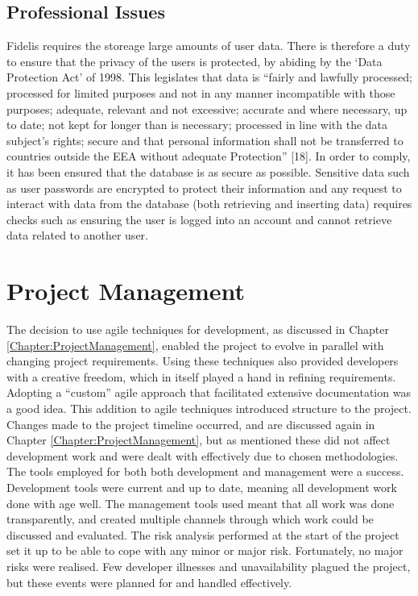 \subsection{Professional Issues}
Fidelis requires the storeage large amounts of user data. There is therefore a duty to ensure that the privacy of the users is protected, by abiding by the `Data Protection Act' of 1998. This legislates that data is ``fairly and lawfully processed; processed for limited purposes and not in any manner incompatible with those purposes; adequate, relevant and not excessive; accurate and where necessary, up to date; not kept for longer than is necessary; processed in line with the data subject's rights; secure and that personal information shall not be transferred to countries outside the EEA without adequate Protection'' [18]. In order to comply, it has been ensured that the database is as secure as possible. Sensitive data such as user passwords are encrypted to protect their information and any request to interact with data from the database (both retrieving and inserting data) requires checks such as ensuring the user is logged into an account and cannot retrieve data related to another user.

\section{Project Management}
The decision to use agile techniques for development, as discussed in Chapter \ref{Chapter:ProjectManagement}, enabled the project to evolve in parallel with changing project requirements. Using these techniques also provided developers with a creative freedom, which in itself played a hand in refining requirements. Adopting a ``custom'' agile approach that facilitated extensive documentation was a good idea. This addition to agile techniques introduced structure to the project. Changes made to the project timeline occurred, and are discussed again in Chapter \ref{Chapter:ProjectManagement}, but as mentioned these did not affect development work and were dealt with effectively due to chosen methodologies. The tools employed for both both development and management were a success. Development tools were current and up to date, meaning all development work done with age well. The management tools used meant that all work was done transparently, and created multiple channels through which work could be discussed and evaluated. The risk analysis performed at the start of the project set it up to be able to cope with any minor or major risk. Fortunately, no major risks were realised. Few developer illnesses and unavailability plagued the project, but these events were planned for and handled effectively.